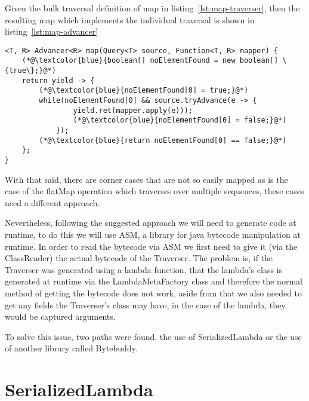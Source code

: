 Given the bulk traversal definition of map in listing~\ref{lst:map-traverser}, then the resulting map which implements the individual traversal is shown in listing~\ref{lst:map-advancer}

\begin{lstlisting}[caption={Map Advancer},label={lst:map-advancer},captionpos=b]
<T, R> Advancer<R> map(Query<T> source, Function<T, R> mapper) {
	(*@\textcolor{blue}{boolean[] noElementFound = new boolean[] \{true\};}@*)
	return yield -> {
		(*@\textcolor{blue}{noElementFound[0] = true;}@*)
		while(noElementFound[0] && source.tryAdvance(e -> {
				yield.ret(mapper.apply(e)));
				(*@\textcolor{blue}{noElementFound[0] = false;}@*)
			});
		(*@\textcolor{blue}{return noElementFound[0] == false;}@*)
	};
}
\end{lstlisting}

With that said, there are corner cases that are not so easily mapped as is the case of the flatMap operation which traverses over multiple sequences, these cases need a different approach.

Nevertheless, following the suggested approach we will need to generate code at runtime, to do this we will use ASM, a library for java bytecode manipulation at runtime. In order to read the bytecode via ASM we first need to give it (via the ClassReader) the actual bytecode of the Traverser. The problem is, if the Traverser was generated using a lambda function, that the lambda's class is generated at runtime via the LambdaMetaFactory class and therefore the normal method of getting the bytecode does not work, aside from that we also needed to get any fields the Traverser's class may have, in the case of the lambda, they would be captured arguments.

To solve this issue, two paths were found\citep{stackoverflowlambdacode}, the use of SerializedLambda\citep{serializedlambda} or the use of another library called Bytebuddy.

\section{SerializedLambda}

